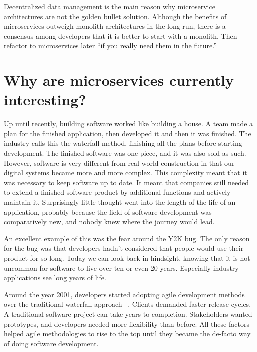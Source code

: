 Decentralized data management is the main reason why microservice architectures are not the golden bullet solution. Although the benefits of microservices outweigh monolith architectures in the long run, there is a consensus among developers that it is better to start with a monolith. Then refactor to microservices later ``if you really need them in the future.'' ~\cite{krivtsov.2019}


\section{Why are microservices currently interesting?}
\label{sec:theory:interesting}

Up until recently, building software worked like building a house. A team made a plan for the finished application, then developed it and then it was finished. The industry calls this the waterfall method, finishing all the plans before starting development. The finished software was one piece, and it was also sold as such. However, software is very different from real-world construction in that our digital systems became more and more complex. This complexity meant that it was necessary to keep software up to date. It meant that companies still needed to extend a finished software product by additional functions and actively maintain it. Surprisingly little thought went into the length of the life of an application, probably because the field of software development was comparatively new, and nobody knew where the journey would lead.

An excellent example of this was the fear around the Y2K bug. The only reason for the bug was that developers hadn't considered that people would use their product for so long. Today we can look back in hindsight, knowing that it is not uncommon for software to live over ten or even 20 years. Especially industry applications see long years of life.

Around the year 2001, developers started adopting agile development methods over the traditional waterfall approach ~\cite{agile.2020}. Clients demanded faster release cycles. A traditional software project can take years to completion. Stakeholders wanted prototypes, and developers needed more flexibility than before. All these factors helped agile methodologies to rise to the top until they became the de-facto way of doing software development.

